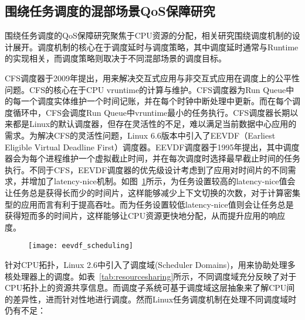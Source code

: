 \subsection{围绕任务调度的混部场景QoS保障研究}


围绕任务调度的QoS保障研究聚焦于CPU资源的分配，相关研究围绕调度机制的设计展开。调度机制的核心在于调度延时与调度策略，其中调度延时通常与Runtime的实现相关，而调度策略则取决于不同混部场景的调度目标。

CFS调度器\citep{pabla2009completely}于2009年提出，用来解决交互式应用与非交互式应用在调度上的公平性问题。CFS的核心在于CPU vruntime的计算与维护。CFS调度器为Run Queue中的每一个调度实体维护一个时间记账，并在每个时钟中断处理中更新。而在每个调度循环中，CFS会调度Run Queue中vruntime最小的任务执行。CFS调度器长期以来都是Linux的默认调度器，但存在灵活性的不足，难以满足当前数据中心应用的需求。为解决CFS的灵活性问题，Linux 6.6版本中引入了EEVDF（Earliest Eligible Virtual Deadline First）调度器。EEVDF调度器\citep{stoica1995earliest}于1995年提出，其中调度器会为每个进程维护一个虚拟截止时间，并在每次调度时选择最早截止时间的任务执行。不同于CFS，EEVDF调度器的优先级设计考虑到了应用对时间片的不同需求，并增加了latency-nice机制。如图~\ref{fig:eevdf_scheduling}所示，为任务设置较高的latency-nice值会让任务总是获得长而少的时间片，这样能够减少上下文切换的次数，对于计算密集型的应用而言有利于提高吞吐。而为任务设置较低latency-nice值则会让任务总是获得短而多的时间片，这样能够让CPU资源更快地分配，从而提升应用的响应度。

\begin{figure}[!htbp]
    \centering
    \texttt{[image: eevdf\_scheduling]}
    \label{fig:eevdf_scheduling}
\end{figure}

针对CPU拓扑，Linux 2.6中引入了调度域(Scheduler Domains)\citep{schedulerdomains}，用来协助处理多核处理器上的调度。如表~\ref{tab:resourcesharing}所示，不同调度域充分反映了对于CPU拓扑上的资源共享信息。而调度子系统可基于调度域这层抽象来了解CPU间的差异性，进而针对性地进行调度。然而Linux任务调度机制在处理不同调度域时仍有不足：

